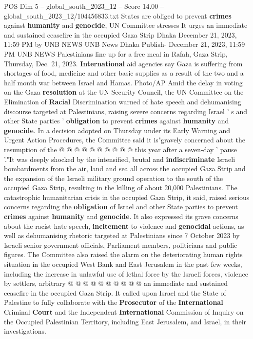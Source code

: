\begin{textsample}{POS Dim 5 – global\_south\_2023\_12 – Score 14.00 – global\_south\_2023\_12/104456833.txt}  \label{ex:f5_pos_109}
States are obliged to prevent \textbf{crimes} against \textbf{humanity} and \textbf{genocide}, UN Committee stresses It urges an immediate and sustained ceasefire in the occupied Gaza Strip Dhaka December 21, 2023, 11:59 PM by UNB NEWS UNB News Dhaka Publish- December 21, 2023, 11:59 PM UNB NEWS Palestinians line up for a free meal in Rafah, Gaza Strip, Thursday, Dec. 21, 2023. \textbf{International} aid agencies say Gaza is suffering from shortages of food, medicine and other basic supplies as a result of the two and a half month war between Israel and Hamas.
Photo/AP Amid the delay in voting on the Gaza \textbf{resolution} at the UN Security Council, the UN Committee on the Elimination of \textbf{Racial} Discrimination warned of hate speech and dehumanising discourse targeted at Palestinians, raising severe concerns regarding Israel ' s and other State parties ' \textbf{obligation} to prevent \textbf{crimes} against \textbf{humanity} and \textbf{genocide}.
In a decision adopted on Thursday under its Early Warning and Urgent Action Procedures, the Committee said it is"gravely concerned about the resumption of the @ @ @ @ @ @ @ @ @ @ this year after a seven-day ' pause '."It was deeply shocked by the intensified, brutal and \textbf{indiscriminate} Israeli bombardments from the air, land and sea all across the occupied Gaza Strip and the expansion of the Israeli military ground operation to the south of the occupied Gaza Strip, resulting in the killing of about 20,000 Palestinians.
The catastrophic humanitarian crisis in the occupied Gaza Strip, it said, raised serious concerns regarding the \textbf{obligation} of Israel and other State parties to prevent \textbf{crimes} against \textbf{humanity} and \textbf{genocide}.
It also expressed its grave concerns about the racist hate speech, \textbf{incitement} to violence and \textbf{genocidal} actions, as well as dehumanising rhetoric targeted at Palestinians since 7 October 2023 by Israeli senior government officials, Parliament members, politicians and public figures.
The Committee also raised the alarm on the deteriorating human rights situation in the occupied West Bank and East Jerusalem in the past few weeks, including the increase in unlawful use of lethal force by the Israeli forces, violence by settlers, arbitrary @ @ @ @ @ @ @ @ @ @ an immediate and sustained ceasefire in the occupied Gaza Strip.
It called upon Israel and the State of Palestine to fully collaborate with the \textbf{Prosecutor} of the \textbf{International} Criminal \textbf{Court} and the Independent \textbf{International} Commission of Inquiry on the Occupied Palestinian Territory, including East Jerusalem, and Israel, in their investigations.

\end{textsample}
